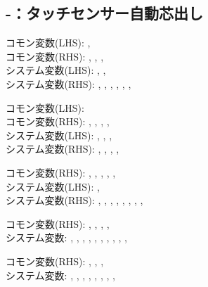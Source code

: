 \subsection{-：タッチセンサー自動芯出し}
\begin{hosoku}\small
コモン変数(LHS): , \\
コモン変数(RHS): , , , \\
システム変数(LHS): , , \\
システム変数(RHS): , , , , , , 
\end{hosoku}

\begin{hosoku}\small
コモン変数(LHS): \\
コモン変数(RHS): , , , , \\
システム変数(LHS): , , , \\
システム変数(RHS): , , , , 
\end{hosoku}

\begin{hosoku}\small
コモン変数(RHS): , , , , , \\
システム変数(LHS): , \\
システム変数(RHS): , , , , , , , , 
\end{hosoku}

\begin{hosoku}\small
コモン変数(RHS): , , , , \\
システム変数: , , , , , , , , , , 
\end{hosoku}

\begin{hosoku}\small
コモン変数(RHS): , , , \\
システム変数: , , , , , , , , 
\end{hosoku}

